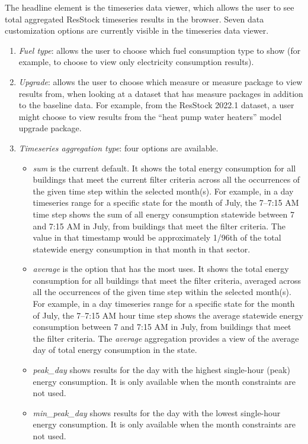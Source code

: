 The headline element is the timeseries data viewer, which allows the user to see total aggregated ResStock timeseries results in the browser. Seven data customization options are currently visible in the timeseries data viewer. 
\begin{enumerate}
    \item \textit{Fuel type}: allows the user to choose which fuel consumption type to show (for example, to choose to view only electricity consumption results).
    \item   \textit{Upgrade}: allows the user to choose which measure or measure package to view results from, when looking at a dataset that has measure packages in addition to the baseline data. For example, from the ResStock 2022.1 dataset, a user might choose to view results from the ``heat pump water heaters'' model upgrade package.
    \item  \textit{Timeseries aggregation type}: four options are available.
    \begin{itemize}
        \item \textit{sum} is the current default. It shows the total energy consumption for all buildings that meet the current filter criteria across all the occurrences of the given time step within the selected month(s). For example, in a day timeseries range for a specific state for the month of July, the 7--7:15 AM time step shows the sum of all energy consumption statewide between 7 and 7:15 AM in July, from buildings that meet the filter criteria. The value in that timestamp would be approximately 1/96th of the total statewide energy consumption in that month in that sector. 
\item \textit{average} is the option that has the most uses. It shows the total energy consumption for all buildings that meet the filter criteria, averaged across all the occurrences of the given time step within the selected month(s). For example, in a day timeseries range for a specific state for the month of July, the 7--7:15 AM hour time step shows the average statewide energy consumption between 7 and 7:15 AM in July, from buildings that meet the filter criteria. The \textit{average} aggregation provides a view of the average day of total energy consumption in the state. 
\item \textit{peak\_day} shows results for the day with the highest single-hour (peak) energy consumption. It is only available when the month constraints are not used.
\item \textit{min\_peak\_day} shows results for the day with the lowest single-hour energy consumption. It is only available when the month constraints are not used.

\end{itemize}
\end{enumerate}
